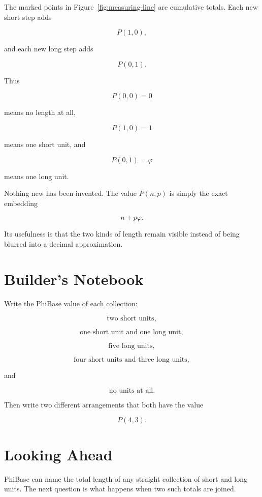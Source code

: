 The marked points in Figure~\ref{fig:measuring-line} are cumulative totals. Each new short step adds

\[
P(1,0),
\]

and each new long step adds

\[
P(0,1).
\]

Thus

\[
P(0,0)=0
\]

means no length at all,

\[
P(1,0)=1
\]

means one short unit, and

\[
P(0,1)=\varphi
\]

means one long unit.

Nothing new has been invented. The value \(P(n,p)\) is simply the exact embedding

\[
n+p\varphi.
\]

Its usefulness is that the two kinds of length remain visible instead of being blurred into a decimal approximation.

\section*{Builder's Notebook}

Write the PhiBase value of each collection:

\[
\text{two short units},
\]

\[
\text{one short unit and one long unit},
\]

\[
\text{five long units},
\]

\[
\text{four short units and three long units},
\]

and

\[
\text{no units at all}.
\]

Then write two different arrangements that both have the value

\[
P(4,3).
\]

\section*{Looking Ahead}

PhiBase can name the total length of any straight collection of short and long units. The next question is what happens when two such totals are joined.
